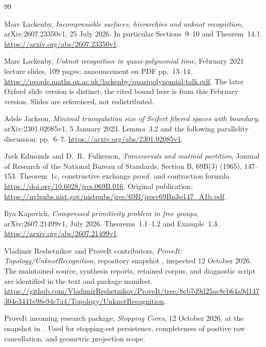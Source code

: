 \begin{thebibliography}{99}

Marc Lackenby,
\emph{Incompressible surfaces, hierarchies and unknot recognition},
arXiv:2607.23350v1, 25 July 2026.
In particular Sections~9--10 and Theorem~14.1.
\url{https://arxiv.org/abs/2607.23350v1}.

Marc Lackenby,
\emph{Unknot recognition in quasi-polynomial time},
February 2021 lecture slides, 109 pages; announcement on PDF pp.~13--14.
\url{https://people.maths.ox.ac.uk/lackenby/quasipolynomial-talk.pdf}.
The later Oxford slide version is distinct; the cited bound here is from
this February version. Slides are referenced, not redistributed.

Adele Jackson,
\emph{Minimal triangulation size of Seifert fibered spaces with boundary},
arXiv:2301.02085v1, 5 January 2023.
Lemma~3.2 and the following parallelity discussion, pp.~6--7.
\url{https://arxiv.org/abs/2301.02085v1}.

Jack Edmonds and D.~R.~Fulkerson,
\emph{Transversals and matroid partition},
Journal of Research of the National Bureau of Standards, Section B,
69B(3) (1965), 147--153.
Theorem~1c, constructive exchange proof, and contraction formula.
\url{https://doi.org/10.6028/jres.069B.016}.
Original publication:
\url{https://nvlpubs.nist.gov/nistpubs/jres/69B/jresv69Bn3p147_A1b.pdf}.

Ilya Kapovich,
\emph{Compressed primitivity problem in free groups},
arXiv:2607.21499v1, July 2026.
Theorems~1.1--1.2 and Example~1.3.
\url{https://arxiv.org/abs/2607.21499v1}.

Vladimir Reshetnikov and ProveIt contributors,
\emph{ProveIt: Topology/UnknotRecognition},
repository snapshot \sourcecommit, inspected 12 October 2026.
The maintained source, synthesis reports, retained corpus, and diagnostic
script are identified in the text and package manifest.
\url{https://github.com/VladimirReshetnikov/ProveIt/tree/8cb7d9d25ac8cb64a9d147304e3441e98e94c7a4/Topology/UnknotRecognition}.

ProveIt incoming research package,
\emph{Stopping Cores}, 12 October 2026.
at the snapshot in~\cite{repo}. Used for stopping-set persistence,
completeness of positive raw cancellation, and geometric projection scope.


\end{thebibliography}
